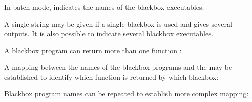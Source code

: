 \documentclass[letterpaper,10pt,english]{sphinxmanual}
\begin{document}
\subsubsection{}
\label{\detokenize{HowToUseNomad:bb-exe}}\label{\detokenize{HowToUseNomad:id5}}
\sphinxAtStartPar
In batch mode,  indicates the names of the blackbox executables.

\sphinxAtStartPar
A single string may be given if a single blackbox is used and gives several outputs. It is also possible to indicate several blackbox executables.

\sphinxAtStartPar
A blackbox program can return more than one function {\hyperref[\detokenize{HowToUseNomad:bb-output-type}]{}}:

\begin{sphinxVerbatim}[commandchars=\\\{\}]
                      
             
\end{sphinxVerbatim}

\sphinxAtStartPar
A mapping between the names of the blackbox programs and the  may be established to identify which function is returned by which blackbox:

\begin{sphinxVerbatim}[commandchars=\\\{\}]
              
               
\end{sphinxVerbatim}

\sphinxAtStartPar
Blackbox program names can be repeated to establish more complex mapping:
\end{document}
